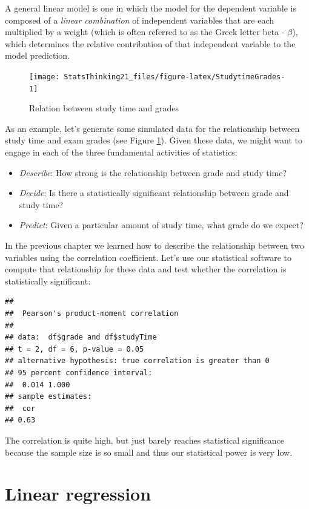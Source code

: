 \documentclass[12pt,]{book}
\providecommand{\tightlist}{%
  \setlength{\itemsep}{0pt}\setlength{\parskip}{0pt}}
\theoremstyle{definition}
\theoremstyle{definition}
\theoremstyle{definition}
\theoremstyle{remark}
\begin{document}
A general linear model is one in which the model for the dependent variable is composed of a \emph{linear combination} of independent variables that are each multiplied by a weight (which is often referred to as the Greek letter beta - \(\beta\)), which determines the relative contribution of that independent variable to the model prediction.

\begin{figure}
\texttt{[image: StatsThinking21\_files/figure-latex/StudytimeGrades-1]} \caption{Relation between study time and grades}\label{fig:StudytimeGrades}
\end{figure}

As an example, let's generate some simulated data for the relationship between study time and exam grades (see Figure \ref{fig:StudytimeGrades}). Given these data, we might want to engage in each of the three fundamental activities of statistics:

\begin{itemize}
\tightlist
\item
  \emph{Describe}: How strong is the relationship between grade and study time?
\item
  \emph{Decide}: Is there a statistically significant relationship between grade and study time?
\item
  \emph{Predict}: Given a particular amount of study time, what grade do we expect?
\end{itemize}

In the previous chapter we learned how to describe the relationship between two variables using the correlation coefficient. Let's use our statistical software to compute that relationship for these data and test whether the correlation is statistically significant:

\begin{verbatim}
## 
##  Pearson's product-moment correlation
## 
## data:  df$grade and df$studyTime
## t = 2, df = 6, p-value = 0.05
## alternative hypothesis: true correlation is greater than 0
## 95 percent confidence interval:
##  0.014 1.000
## sample estimates:
##  cor 
## 0.63
\end{verbatim}

The correlation is quite high, but just barely reaches statistical significance because the sample size is so small and thus our statistical power is very low.

\hypertarget{linear-regression}{%
\section{Linear regression}\label{linear-regression}}
\end{document}
